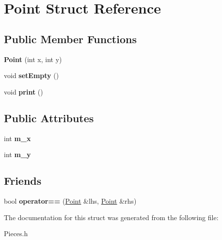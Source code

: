 \hypertarget{struct_point}{\section{Point Struct Reference}
\label{struct_point}
}
\subsection*{Public Member Functions}
\begin{DoxyCompactItemize}
\item 
\hypertarget{struct_point_a001c4958c310b248f5c26037aea38a9c}{{\bfseries Point} (int x, int y)}\label{struct_point_a001c4958c310b248f5c26037aea38a9c}

\item 
\hypertarget{struct_point_a26844fd8368a6c5d34713d8ac1185fbe}{void {\bfseries set\-Empty} ()}\label{struct_point_a26844fd8368a6c5d34713d8ac1185fbe}

\item 
\hypertarget{struct_point_a76c5855c06d98aed16b5796a9a50bbee}{void {\bfseries print} ()}\label{struct_point_a76c5855c06d98aed16b5796a9a50bbee}

\end{DoxyCompactItemize}
\subsection*{Public Attributes}
\begin{DoxyCompactItemize}
\item 
\hypertarget{struct_point_a885daee8c5064cd51f6a4c3888091fc9}{int {\bfseries m\-\_\-x}}\label{struct_point_a885daee8c5064cd51f6a4c3888091fc9}

\item 
\hypertarget{struct_point_a00e243381d01e186dc2fcc5d24b4d3be}{int {\bfseries m\-\_\-y}}\label{struct_point_a00e243381d01e186dc2fcc5d24b4d3be}

\end{DoxyCompactItemize}
\subsection*{Friends}
\begin{DoxyCompactItemize}
\item 
\hypertarget{struct_point_a75de5fa7971bc4ffdd3c5d06d776495c}{bool {\bfseries operator==} (\hyperlink{struct_point}{Point} \&lhs, \hyperlink{struct_point}{Point} \&rhs)}\label{struct_point_a75de5fa7971bc4ffdd3c5d06d776495c}

\end{DoxyCompactItemize}


The documentation for this struct was generated from the following file\-:\begin{DoxyCompactItemize}
\item 
Pieces.\-h\end{DoxyCompactItemize}
